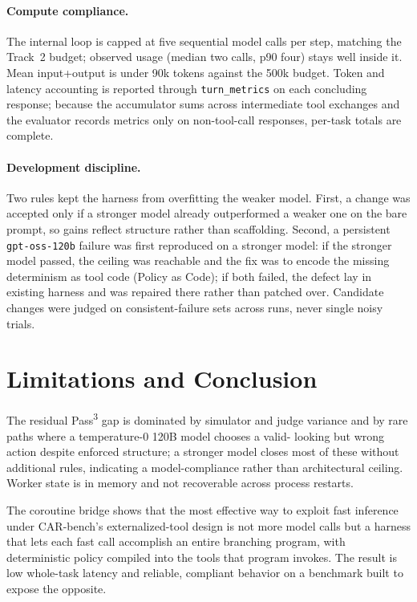 \documentclass{article}
\begin{document}
\paragraph{Compute compliance.}
The internal loop is capped at five sequential model calls per step, matching
the Track~2 budget; observed usage (median two calls, p90 four) stays well
inside it. Mean input+output is under 90k tokens against the 500k budget.
Token and latency accounting is reported through \texttt{turn\_metrics} on each
concluding response; because the accumulator sums across intermediate tool
exchanges and the evaluator records metrics only on non-tool-call responses,
per-task totals are complete.

\paragraph{Development discipline.}
Two rules kept the harness from overfitting the weaker model. First, a change
was accepted only if a stronger model already outperformed a weaker one on the
bare prompt, so gains reflect structure rather than scaffolding. Second, a
persistent \texttt{gpt-oss-120b} failure was first reproduced on a stronger
model: if the stronger model passed, the ceiling was reachable and the fix was
to encode the missing determinism as tool code (Policy as Code); if both
failed, the defect lay in existing harness and was repaired there rather than
patched over. Candidate changes were judged on consistent-failure sets across
runs, never single noisy trials.

\section{Limitations and Conclusion}

The residual Pass\textsuperscript{3} gap is dominated by simulator and judge
variance and by rare paths where a temperature-0 120B model chooses a valid-
looking but wrong action despite enforced structure; a stronger model closes
most of these without additional rules, indicating a model-compliance rather
than architectural ceiling. Worker state is in memory and not recoverable
across process restarts.

The coroutine bridge shows that the most effective way to exploit fast
inference under CAR-bench's externalized-tool design is not more model calls
but a harness that lets each fast call accomplish an entire branching program,
with deterministic policy compiled into the tools that program invokes. The
result is low whole-task latency and reliable, compliant behavior on a
benchmark built to expose the opposite.



\end{document}
